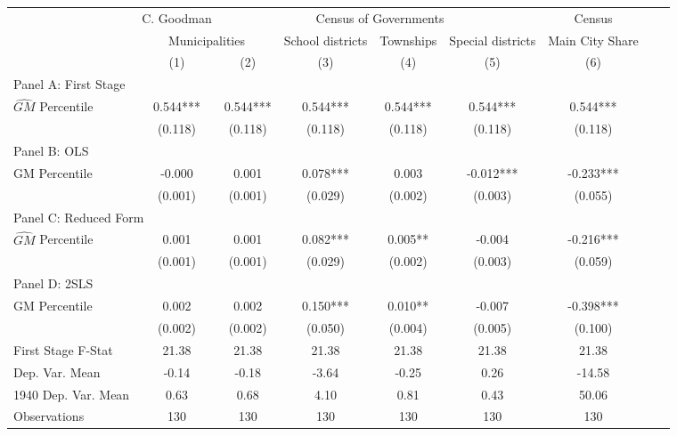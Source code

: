 \begin{tabular}{l*{8}{c}} \toprule
&\multicolumn{1}{c}{C. Goodman}&\multicolumn{4}{c}{Census of Governments}&\multicolumn{1}{c}{Census}\\\cmidrule(lr){2-2}\cmidrule(lr){3-6}\cmidrule(lr){7-7}
&\multicolumn{2}{c}{Municipalities}&\multicolumn{1}{c}{School districts}&\multicolumn{1}{c}{Townships}&\multicolumn{1}{c}{Special districts}&\multicolumn{1}{c}{Main City Share}\\\cmidrule(lr){2-3}\cmidrule(lr){4-6}\cmidrule(lr){7-7}
&\multicolumn{1}{c}{(1)}&\multicolumn{1}{c}{(2)}&\multicolumn{1}{c}{(3)}&\multicolumn{1}{c}{(4)}&\multicolumn{1}{c}{(5)}&\multicolumn{1}{c}{(6)}\\
\cmidrule(lr){1-7}
\multicolumn{6}{l}{Panel A: First Stage}\\
\cmidrule(lr){1-7}
$\widehat{GM}$ Percentile&    0.544***&    0.544***&    0.544***&    0.544***&    0.544***&    0.544***\\
                &  (0.118)   &  (0.118)   &  (0.118)   &  (0.118)   &  (0.118)   &  (0.118)   \\
\cmidrule(lr){1-7}
\multicolumn{6}{l}{Panel B: OLS}\\
\cmidrule(lr){1-7}
GM Percentile   &   -0.000   &    0.001   &    0.078***&    0.003   &   -0.012***&   -0.233***\\
                &  (0.001)   &  (0.001)   &  (0.029)   &  (0.002)   &  (0.003)   &  (0.055)   \\
\cmidrule(lr){1-7}
\multicolumn{6}{l}{Panel C: Reduced Form}\\
\cmidrule(lr){1-7}
$\widehat{GM}$ Percentile&    0.001   &    0.001   &    0.082***&    0.005** &   -0.004   &   -0.216***\\
                &  (0.001)   &  (0.001)   &  (0.029)   &  (0.002)   &  (0.003)   &  (0.059)   \\
\cmidrule(lr){1-7}
\multicolumn{6}{l}{Panel D: 2SLS}\\
\cmidrule(lr){1-7}
GM Percentile   &    0.002   &    0.002   &    0.150***&    0.010** &   -0.007   &   -0.398***\\
                &  (0.002)   &  (0.002)   &  (0.050)   &  (0.004)   &  (0.005)   &  (0.100)   \\
\midrule
First Stage F-Stat&    21.38   &    21.38   &    21.38   &    21.38   &    21.38   &    21.38   \\
Dep. Var. Mean  &    -0.14   &    -0.18   &    -3.64   &    -0.25   &     0.26   &   -14.58   \\
1940 Dep. Var. Mean&     0.63   &     0.68   &     4.10   &     0.81   &     0.43   &    50.06   \\
Observations    &      130   &      130   &      130   &      130   &      130   &      130   \\
       \bottomrule \end{tabular}
